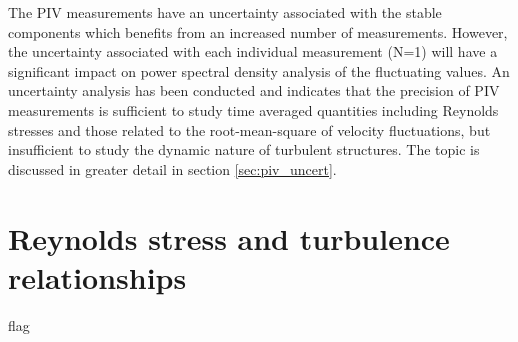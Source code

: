 The PIV measurements have an uncertainty associated with the stable components 
which benefits from an increased number of measurements. However, the 
uncertainty associated with each individual measurement (N=1) will have a 
significant impact on power spectral density analysis of the fluctuating 
values. An uncertainty analysis has been conducted and indicates that the 
precision of PIV measurements is sufficient to study time averaged quantities 
including Reynolds stresses and those related to the root-mean-square of 
velocity fluctuations, but insufficient to study the dynamic nature of 
turbulent structures. The topic is discussed in greater detail in section 
\ref{sec:piv_uncert}.

\section{Reynolds stress and turbulence relationships}

flag

